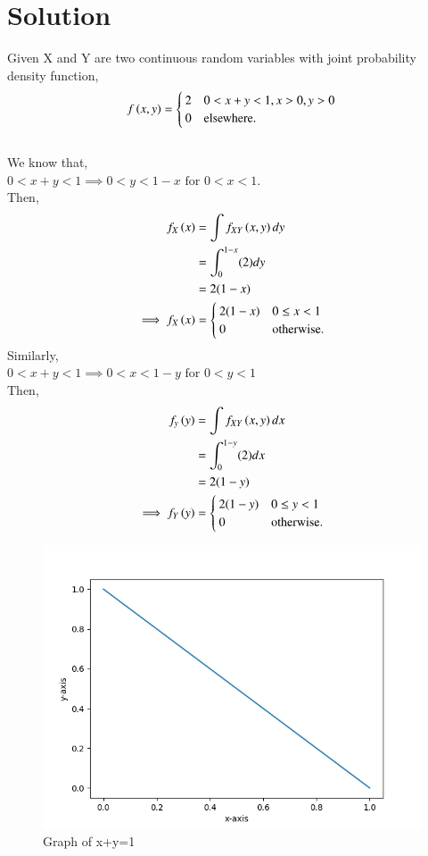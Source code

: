 \documentclass[journal,12pt,twocolumn]{IEEEtran}
\begin{document}
\section{\textbf{Solution}}
Given X and Y are two continuous random variables with joint probability density function,
\begin{align}
f\left(x,y\right)= 
\begin{cases}
2 & 0<x+y<1, x>0, y>0 \\
0 & \text{elsewhere}.
\end{cases}    
\end{align}
\\We know that,\\
$0<x+y<1  \implies 0<y<1-x \text{ for } 0<x<1.$\\ 
Then,
\begin{align}
    f_X\left(x\right) &= \int f_{XY}\left(x,y\right)dy\\
    &= \int_{0}^{1-x} (2)dy\\
    &= 2(1-x)\\
\implies f_X\left(x\right) &=
    \begin{cases}
    2(1-x) & 0 \leq x <1\\
    0 & \text{otherwise}.
    \end{cases}
\end{align}
Similarly,\\
$ 0<x+y<1 \implies 0<x<1-y \text{ for } 0<y<1$ \\
Then,
\begin{align}
    f_y\left(y\right) &= \int f_{XY}\left(x,y\right)dx\\
    &= \int_{0}^{1-y} (2)dx\\
    &= 2(1-y)\\
\implies f_Y\left(y\right) &=
    \begin{cases}
    2(1-y) & 0 \leq y <1\\
    0 & \text{otherwise}.
    \end{cases}
\end{align}
\begin{figure}[ht]
    \centering
    \includegraphics[width=\columnwidth]{Figure_1.png}
    \caption{Graph of x+y=1}
    \label{Figure_1}
\end{figure}
\end{document}
